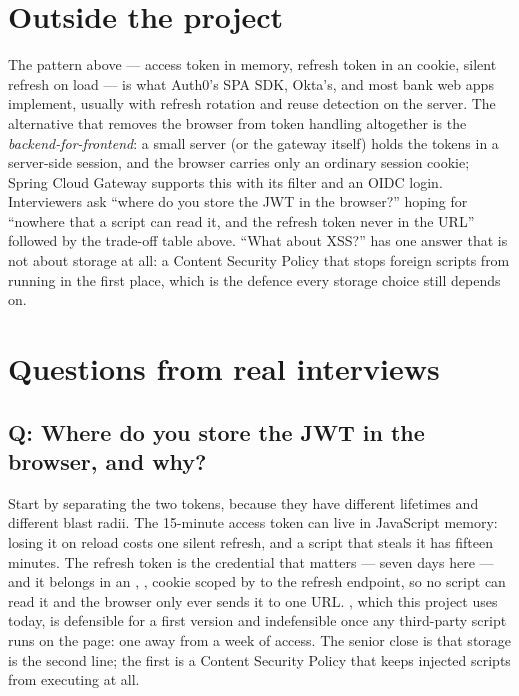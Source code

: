\section{Outside the project}

The pattern above --- access token in memory, refresh token in an
 cookie, silent refresh on load --- is what Auth0's
SPA SDK, Okta's, and most bank web apps implement, usually with refresh
rotation and reuse detection on the server. The alternative that
removes the browser from token handling altogether is the
\emph{backend-for-frontend}: a small server (or the gateway itself)
holds the tokens in a server-side session, and the browser carries only
an ordinary session cookie; Spring Cloud Gateway supports this with its
 filter and an OIDC login. Interviewers ask ``where
do you store the JWT in the browser?'' hoping for ``nowhere that a
script can read it, and the refresh token never in the URL'' followed
by the trade-off table above. ``What about XSS?'' has one answer that
is not about storage at all: a Content Security Policy that stops
foreign scripts from running in the first place, which is the defence
every storage choice still depends on.

\section{Questions from real interviews}

\subsection*{Q: Where do you store the JWT in the browser, and why?}

Start by separating the two tokens, because they have different
lifetimes and different blast radii. The 15-minute access token can
live in JavaScript memory: losing it on reload costs one silent refresh,
and a script that steals it has fifteen minutes. The refresh token is
the credential that matters --- seven days here --- and it belongs in an
, ,  cookie scoped by
 to the refresh endpoint, so no script can read it and the
browser only ever sends it to one URL. , which this
project uses today, is defensible for a first version and indefensible
once any third-party script runs on the page: one 
away from a week of access. The senior close is that storage is the
second line; the first is a Content Security Policy that keeps
injected scripts from executing at all.

